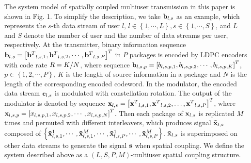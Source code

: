 \documentclass[conference]{IEEEtran}
\begin{document}
The system model of spatially coupled multiuser transmission in this paper is shown in Fig. 1. To simplify the description, we take ${{\bf{b}}_{l,s}}$ as an example, which represents the $s$-th data stream of user $l$, $l \in \left\{ {1, \cdots ,L} \right\},s \in \left\{ {1, \cdots ,S} \right\}$, and $L$ and $S$ denote the number of user and the number of data streams per user, respectively. At the transmitter, binary information sequence ${{\bf{b}}_{l,s}} = {\left[ {{{\bf{b}}^T}_{l,s,1},{{\bf{b}}^T}_{l,s,2}, \cdots ,{{\bf{b}}^T}_{l,s,P}} \right]^T}$ in $P$ packages is encoded by LDPC encoders with code rate $R = {K \mathord{\left/
 {\vphantom {K N}} \right.
 \kern-\nulldelimiterspace} N}$, where sequence ${{\bf{b}}_{l,s,p}} = {\left[ {{b_{l,s,p,1}},{b_{l,s,p,2}}, \cdots ,{b_{l,s,p,K}}} \right]^T}$, $p \in \left\{ {1,2, \cdots ,P} \right\}$, $K$ is the length of source information in a package and $N$ is the length of the corresponding encoded codeword. In the modulator, the encoded data stream ${{\bf{c}}_{l,s}}$ is modulated with constellation rotation. The output of the modulator is denoted by sequence ${{\bf{x}}_{l,s}} = {\left[ {{{\bf{x}}^T}_{l,s,1},{{\bf{x}}^T}_{l,s,2}, \ldots ,{{\bf{x}}^T}_{l,s,P}} \right]^T}$, where ${{\bf{x}}_{l,s,p}} = {\left[ {{x_{l,s,p,1}},{x_{l,s,p,2}}, \cdots ,{x_{l,s,p,N}}} \right]^T}$. Then each package of ${{\bf{x}}_{l,s}}$ is replicated $M$ times and permuted with different interleavers, which produces signal ${{\bf{\tilde x}}_{l,s}}$ composed of $\left\{ {{\bf{\tilde x}}_{l,s,1}^1, \cdots ,{\bf{\tilde x}}_{l,s,1}^M, \cdots ,{\bf{\tilde x}}_{l,s,P}^1, \cdots ,{\bf{\tilde x}}_{l,s,P}^M} \right\}$. ${{\bf{\tilde x}}_{l,s}}$ is superimposed on other data streams to generate the signal ${\bf{s}}$ when spatial coupling. We define the system described above as a $\left( {L,S,P,M} \right)$-multiuser spatial coupling structure.
\end{document}
